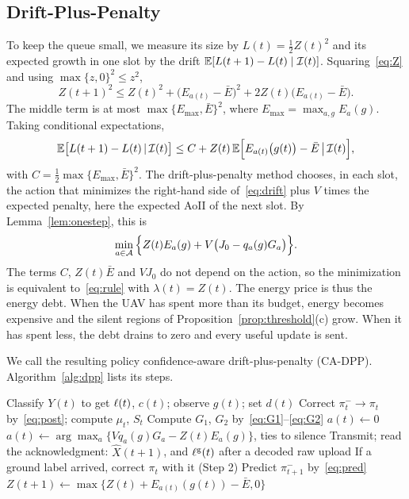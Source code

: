\subsection{Drift-Plus-Penalty}
To keep the queue small, we measure its size by $L(t)=\frac12Z(t)^2$ and its expected growth in one slot by the drift $\mathbb{E}[L(t+1)-L(t)\mid\mathcal{I}(t)]$. Squaring~\eqref{eq:Z} and using $\max\{z,0\}^2\le z^2$,
\[
Z(t+1)^2\le Z(t)^2+\big(E_{a(t)}-\bar E\big)^2+2Z(t)\big(E_{a(t)}-\bar E\big).
\]
The middle term is at most $\max\{E_{\max},\bar E\}^2$, where $E_{\max}=\max_{a,g}E_a(g)$. Taking conditional expectations,
\begin{equation}\label{eq:drift}
\mathbb{E}\big[L(t+1)-L(t)\,|\,\mathcal{I}(t)\big]\le C+Z(t)\,\mathbb{E}\Big[E_{a(t)}\big(g(t)\big)-\bar E\,\big|\,\mathcal{I}(t)\Big],
\end{equation}
with $C=\frac12\max\{E_{\max},\bar E\}^2$. The drift-plus-penalty method chooses, in each slot, the action that minimizes the right-hand side of~\eqref{eq:drift} plus $V$ times the expected penalty, here the expected AoII of the next slot. By Lemma~\ref{lem:onestep}, this is
\[
\min_{a\in\mathcal{A}}\Big\{Z(t)E_a(g)+V\big(J_0-q_a(g)G_a\big)\Big\}.
\]
The terms $C$, $Z(t)\bar E$ and $VJ_0$ do not depend on the action, so the minimization is equivalent to~\eqref{eq:rule} with $\lambda(t)=Z(t)$. The energy price is thus the energy debt. When the UAV has spent more than its budget, energy becomes expensive and the silent regions of Proposition~\ref{prop:threshold}(c) grow. When it has spent less, the debt drains to zero and every useful update is sent.

We call the resulting policy confidence-aware drift-plus-penalty (CA-DPP). Algorithm~\ref{alg:dpp} lists its steps.

\begin{algorithm}[t]
\caption{CA-DPP, executed by the UAV in slot $t$}\label{alg:dpp}
\begin{algorithmic}[1]
\State Classify $Y(t)$ to get $\ell(t)$, $c(t)$; observe $g(t)$; set $d(t)$
\State Correct $\pi^-_t\to\pi_t$ by~\eqref{eq:post}; compute $\mu_t$, $S_t$
\State Compute $G_1$, $G_2$ by~\eqref{eq:G1}--\eqref{eq:G2}
 $a(t)\gets0$
\Else\ $a(t)\gets\arg\max_a\{Vq_a(g)G_a-Z(t)E_a(g)\}$, ties to silence
\EndIf
\State Transmit; read the acknowledgment: $\hat X(t+1)$, and $\ell^{\rm g}(t)$ after a decoded raw upload
\State If a ground label arrived, correct $\pi_t$ with it (Step 2)
\State Predict $\pi^-_{t+1}$ by~\eqref{eq:pred}
\State $Z(t+1)\gets\max\big\{Z(t)+E_{a(t)}(g(t))-\bar E,0\big\}$
\end{algorithmic}
\end{algorithm}

